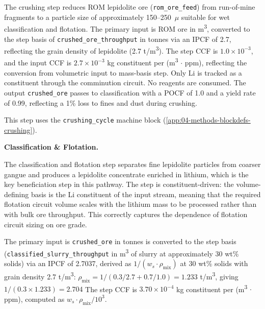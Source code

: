 The crushing step reduces ROM lepidolite ore (\texttt{rom\_ore\_feed}) from run-of-mine fragments to a particle size of approximately 150--250~$\mu$ suitable for wet classification and flotation. The primary input is ROM ore in m\textsuperscript{3}, converted to the step basis of \texttt{crushed\_ore\_throughput} in tonnes via an IPCF of 2.7, reflecting the grain density of lepidolite (2.7 t/m\textsuperscript{3}). The step CCF is $1.0 \times 10^{-3}$, and the input CCF is $2.7 \times 10^{-3}$ kg constituent per (m\textsuperscript{3} $\cdot$ ppm), reflecting the conversion from volumetric input to mass-basis step. Only Li is tracked as a constituent through the comminution circuit. No reagents are consumed. The output \texttt{crushed\_ore} passes to classification with a POCF of 1.0 and a yield rate of 0.99, reflecting a 1\% loss to fines and dust during crushing.

This step uses the \texttt{crushing\_cycle} machine block (\ref{app:04-methods-blockdefs-crushing}).

\medskip
\noindent\textbf{Classification \& Flotation.}\quad

The classification and flotation step separates fine lepidolite particles from coarser gangue and produces a lepidolite concentrate enriched in lithium, which is the key beneficiation step in this pathway. The step is constituent-driven: the volume-defining basis is the Li constituent of the input stream, meaning that the required flotation circuit volume scales with the lithium mass to be processed rather than with bulk ore throughput. This correctly captures the dependence of flotation circuit sizing on ore grade.

The primary input is \texttt{crushed\_ore} in tonnes is converted to the step basis (\texttt{classified\_slurry\_throughput} in m\textsuperscript{3} of slurry at approximately 30 wt\% solids) via an IPCF of 2.7037, derived as $1/(w_s \cdot \rho_{\text{mix}})$ at 30 wt\% solids with grain density 2.7 t/m\textsuperscript{3}: $\rho_{\text{mix}} = 1/(0.3/2.7 + 0.7/1.0) = 1.233$ t/m\textsuperscript{3}, giving $1/(0.3 \times 1.233) = 2.704$ The step CCF is $3.70 \times 10^{-4}$ kg constituent per (m\textsuperscript{3} $\cdot$ ppm), computed as $w_s \cdot \rho_{\text{mix}} / 10^3$.

